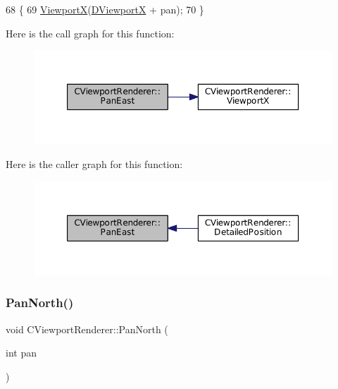 \begin{DoxyCode}
68                                       \{
69     \hyperlink{classCViewportRenderer_adf6c09ee00cdbf0803e72d59bff9a235}{ViewportX}(\hyperlink{classCViewportRenderer_aea9e05347f71a8e6b83439aab653be18}{DViewportX} + pan);
70 \}
\end{DoxyCode}
Here is the call graph for this function\+:
\nopagebreak
\begin{figure}[H]
\begin{center}
\leavevmode
\includegraphics[width=350pt]{classCViewportRenderer_a047d0b83f7744a9d8b184471dae0cd3c_cgraph}
\end{center}
\end{figure}
Here is the caller graph for this function\+:
\nopagebreak
\begin{figure}[H]
\begin{center}
\leavevmode
\includegraphics[width=350pt]{classCViewportRenderer_a047d0b83f7744a9d8b184471dae0cd3c_icgraph}
\end{center}
\end{figure}
\hypertarget{classCViewportRenderer_a3dae20056eb4f9fc1c7d8238737ab290}{}\label{classCViewportRenderer_a3dae20056eb4f9fc1c7d8238737ab290} 
\subsubsection{\texorpdfstring{Pan\+North()}{PanNorth()}}
{\footnotesize\ttfamily void C\+Viewport\+Renderer\+::\+Pan\+North (\begin{DoxyParamCaption}\item[{int}]{pan }\end{DoxyParamCaption})}



